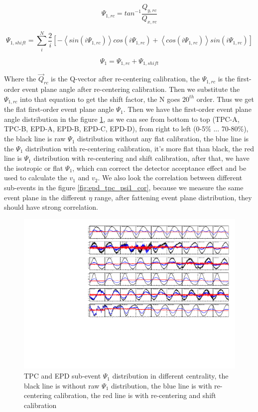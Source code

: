 \begin{equation}
	\Psi_{1, rc} = tan^{-1}
	\frac{Q_{y, rc}}{Q_{x, rc}}
	\label{equ:psi1_recenter}
\end{equation}

\begin{equation}
	\Psi_{1, shift} = 
	\sum_{i}^{N} \frac{2}{i}
	\left[ -\left< sin(i\Psi_{1, rc}) \right>cos(i\Psi_{1, rc})+
	\left< cos(i\Psi_{1, rc}) \right>sin(i\Psi_{1, rc})\right]
	\label{equ:shift}
\end{equation}

\begin{equation}
	\Psi_{1} = \Psi_{1, rc} + \Psi_{1, shift}
	\label{equ:psi1_shift}
\end{equation}

Where the $\vec{Q}_{rc}$ is the Q-vector after re-centering calibration, the $\Psi_{1, rc}$ is the first-order event plane angle after re-centering calibration. Then we substitute the $\Psi_{1, rc}$ into that equation to get the shift factor, the N goes $20^{th}$ order. Thus we get the flat first-order event plane angle $\Psi_{1}$.  Then we have the first-order event plane angle distribution in the figure \ref{fig:epd_tpc_psi1}, as we can see from bottom to top (TPC-A, TPC-B, EPD-A, EPD-B, EPD-C, EPD-D), from right to left (0-5\% ... 70-80\%), the black line is raw $\Psi_{1}$ distribution without any flat calibration, the blue line is the $\Psi_{1}$ distribution with re-centering calibration, it's more flat than black, the red line is $\Psi_{1}$ distribution with re-centering and shift calibration, after that, we have the isotropic or flat $\Psi_{1}$, which can correct the detector acceptance effect and be used to calculate the $v_{1}$ and $v_{2}$. We also look the correlation between different sub-events in the figure \ref{fig:epd_tpc_psi1_cor}, because we measure the same event plane in the different $\eta$ range, after fattening event plane distribution, they should have strong correlation.
\begin{figure}[ht]
\includegraphics[scale=0.6]{chapter2/fig/epd_tpc_psi1_dis.pdf}
\caption{ TPC and EPD sub-event $\Psi_{1}$ distribution in different centrality, the black line is without raw $\Psi_{1}$ distribution, the blue line is with re-centering calibration, the red line is with re-centering and shift calibration}
\label{fig:epd_tpc_psi1}
\end{figure}

